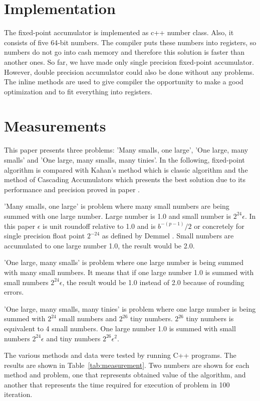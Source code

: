 \documentclass[conference]{IEEEtran}
\begin{document}
\section{Implementation}
The fixed-point accumulator is implemented as c++ number class.
Also, it consists of five 64-bit numbers. The compiler puts these 
numbers into registers, so numbers do not go into cash
memory and therefore this solution is faster than another ones.
So far, we have made only single precision fixed-point 
accumulator. However, double precision accumulator could also 
be done without any problems. The inline methods are used to give compiler
the opportunity to make a good optimization and to fit
everything into registers.

\par


\section{Measurements}
This paper presents three problems: 'Many smalls, one large',
'One large, many smalls' and 'One large, many smalls, many tinies'.
In the following, fixed-point algorithm is compared with Kahan's method
which is classic algorithm and the method of Cascading Accumulators 
which presents the best solution due to its performance and precision 
proved in paper \cite{CascadingAccumulators}.

\par
'Many smalls, one large' is problem where many small numbers 
are being summed with one large number. 
Large number is 1.0 and small number is $2^{24} \epsilon$.
In this paper $\epsilon$ is unit roundoff relative to 1.0 and 
is $b^{-(p-1)}/2$ or concretely for single precision float point $2^{-24}$ as defined by Demmel \cite{DemmelsEpsilon}.
Small numbers are accumulated to one large number 1.0, the result would be 2.0.
\par
'One large, many smalls' is problem where one large number 
is being summed with many small numbers. It means that
if one large number 1.0 is summed with small 
numbers $2^{24} \epsilon$, the result would be 1.0 instead 
of 2.0 because of rounding errors.
\par
'One large, many smalls, many tinies' is problem where one 
large number is being summed with $2^{24}$ small numbers and $2^{26}$
tiny numbers. 
$2^{26}$ tiny numbers is equivalent to 4 small numbers.
One large number 1.0 is 
summed with small numbers $2^{24} \epsilon$ and tiny 
numbers $2^{26} \epsilon^2$.
\par
The various methods and data were tested by running C++ programs.
The results are shown in Table~\ref{tab:measurement}. 
Two numbers are shown for each method and problem, 
one that represents obtained value of the algorithm,
and another that represents the time required for execution of problem in 100 iteration.
\end{document}
